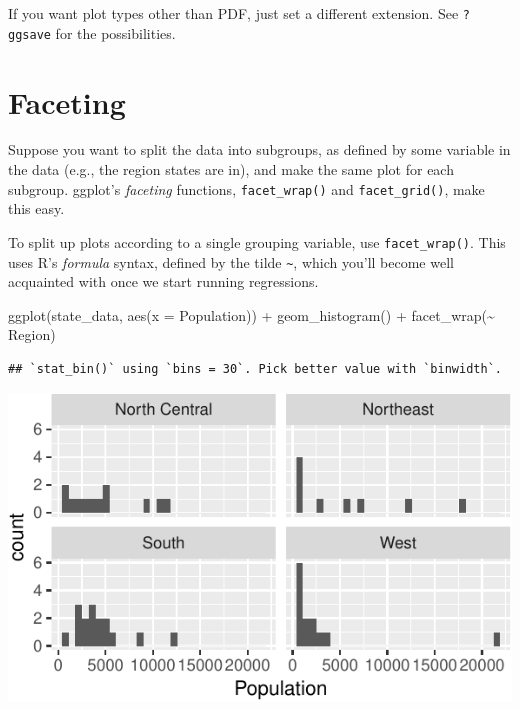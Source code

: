 \documentclass[
  12pt,
  oneside,openany]{book}
\newenvironment{Shaded}{\begin{snugshade}}{\end{snugshade}}
\newcommand{\AttributeTok}[1]{\textcolor[rgb]{0.77,0.63,0.00}{#1}}
\newcommand{\FunctionTok}[1]{\textcolor[rgb]{0.00,0.00,0.00}{#1}}
\newcommand{\NormalTok}[1]{#1}
\newcommand{\SpecialCharTok}[1]{\textcolor[rgb]{0.00,0.00,0.00}{#1}}
\begin{document}
If you want plot types other than PDF, just set a different extension. See \texttt{?ggsave} for the possibilities.

\hypertarget{faceting}{%
\section{Faceting}\label{faceting}}

Suppose you want to split the data into subgroups, as defined by some variable in the data (e.g., the region states are in), and make the same plot for each subgroup. ggplot's \emph{faceting} functions, \texttt{facet\_wrap()} and \texttt{facet\_grid()}, make this easy.

To split up plots according to a single grouping variable, use \texttt{facet\_wrap()}. This uses R's \emph{formula} syntax, defined by the tilde \texttt{\textasciitilde{}}, which you'll become well acquainted with once we start running regressions.

\begin{Shaded}
\begin{Highlighting}[]
\FunctionTok{ggplot}\NormalTok{(state\_data, }\FunctionTok{aes}\NormalTok{(}\AttributeTok{x =}\NormalTok{ Population)) }\SpecialCharTok{+}
  \FunctionTok{geom\_histogram}\NormalTok{() }\SpecialCharTok{+}
  \FunctionTok{facet\_wrap}\NormalTok{(}\SpecialCharTok{\textasciitilde{}}\NormalTok{ Region)}
\end{Highlighting}
\end{Shaded}

\begin{verbatim}
## `stat_bin()` using `bins = 30`. Pick better value with `binwidth`.
\end{verbatim}

\includegraphics{pdaps_files/figure-latex/facet-wrap-1.pdf}
\end{document}
